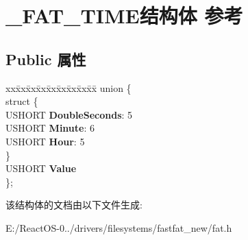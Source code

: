 \hypertarget{struct___f_a_t___t_i_m_e}{}\section{\+\_\+\+F\+A\+T\+\_\+\+T\+I\+M\+E结构体 参考}
\label{struct___f_a_t___t_i_m_e}
\subsection*{Public 属性}
\begin{DoxyCompactItemize}
\item 
\mbox{\label{struct___f_a_t___t_i_m_e_ac074c5b1c14f0a73c3e3a33e2c9f3bd8}} 
\begin{tabbing}
xx\=xx\=xx\=xx\=xx\=xx\=xx\=xx\=xx\=\kill
union \{\\
\mbox{\label{union___f_a_t___t_i_m_e_1_1_0D638_a9fc54307754b7f216be86792386c2e7b}} 
\>struct \{\\
\>\>USHORT {\bfseries DoubleSeconds}: 5\\
\>\>USHORT {\bfseries Minute}: 6\\
\>\>USHORT {\bfseries Hour}: 5\\
\>\} \\
\>USHORT {\bfseries Value}\\
\}; \\

\end{tabbing}\end{DoxyCompactItemize}


该结构体的文档由以下文件生成\+:\begin{DoxyCompactItemize}
\item 
E\+:/\+React\+O\+S-\/0../drivers/filesystems/fastfat\+\_\+new/fat.\+h\end{DoxyCompactItemize}
